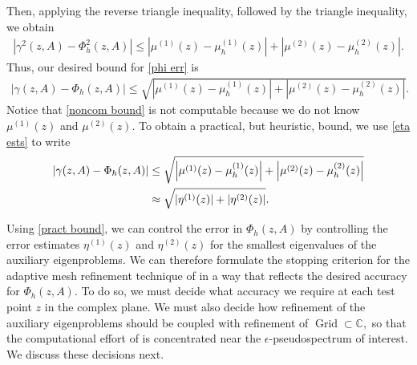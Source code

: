 Then, applying the reverse triangle inequality, followed by the triangle inequality, we obtain 
\begin{align}
    \left| \gamma^2(z, A) - \Phi_h^2(z, A) \right| \le \left|\mu^{(1)}(z)-\mu_h^{(1)}(z) \right| + \left|\mu^{(2)}(z)-\mu_h^{(2)}(z) \right|.
\end{align}
Thus, our desired bound for \eqref{phi err} is 
\begin{align} \label{noncom bound}
    \left| \gamma(z, A) - \Phi_h(z, A) \right| \le \sqrt{\left|\mu^{(1)}(z)-\mu_h^{(1)}(z) \right| + \left|\mu^{(2)}(z)-\mu_h^{(2)}(z) \right|}.
\end{align}
Notice that \eqref{noncom bound} is not computable because we do not know $\mu^{(1)}(z)$ and $\mu^{(2)}(z).$ To obtain a practical, but heuristic, bound, we use \eqref{eta ests} to write 
\begin{align} \label{pract bound}
    |\gamma(z,A)-\Phi_h(z,A)|
    &\leq
    \sqrt{\left|\mu^{(1)}(z)-\mu_h^{(1)}(z)\right|
    + \left|\mu^{(2)}(z)-\mu_h^{(2)}(z)\right| }
    \notag\\
    &\approx
    \sqrt{|\eta^{(1)}(z)|
    +
    |\eta^{(2)}(z)|}.
\end{align}

Using \eqref{pract bound}, we can control the error in $\Phi_h(z, A)$ by controlling the error estimates $\eta^{(1)}(z)$ and $\eta^{(2)}(z)$ for the smallest eigenvalues of the auxiliary eigenproblems. We can therefore formulate the stopping criterion for the adaptive mesh refinement technique of  in a way that reflects the desired accuracy for $\Phi_h(z, A).$ To do so, we must decide what accuracy we require at each test point $z$ in the complex plane. We must also decide how refinement of the auxiliary eigenproblems should be coupled with refinement of $\operatorname{Grid} \subset \mathbb{C},$ so that the computational effort of  is concentrated near the $ \epsilon$-pseudospectrum of interest. We discuss these decisions next. 

